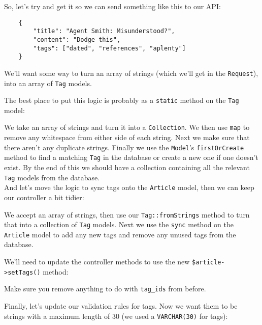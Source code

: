 So, let's try and get it so we can send something like this to our API:

\begin{verbatim}
    {
        "title": "Agent Smith: Misunderstood?",
        "content": "Dodge this",
        "tags": ["dated", "references", "aplenty"]
    }
\end{verbatim}


We'll want some way to turn an array of strings (which we'll get in the \texttt{Request}), into an array of \texttt{Tag} models.

\pagebreak

The best place to put this logic is probably as a \texttt{static} method on the \texttt{Tag} model:


We take an array of strings and turn it into a \texttt{Collection}. We then use \texttt{map} to remove any whitespace from either side of each string. Next we make sure that there aren't any duplicate strings. Finally we use the \texttt{Model}'s \texttt{firstOrCreate} method to find a matching \texttt{Tag} in the database or create a new one if one doesn't exist. By the end of this we should have a collection containing all the relevant \texttt{Tag} models from the database.
\\

And let's move the logic to sync tags onto the \texttt{Article} model, then we can keep our controller a bit tidier:


We accept an array of strings, then use our \texttt{Tag::fromStrings} method to turn that into a collection of \texttt{Tag} models. Next we use the \texttt{sync} method on the \texttt{Article} model to add any new tags and remove any unused tags from the database.

\pagebreak

We'll need to update the controller methods to use the new \texttt{\$article->setTags()} method:


Make sure you remove anything to do with \texttt{tag\_ids} from before.

\pagebreak

Finally, let's update our validation rules for tags. Now we want them to be strings with a maximum length of 30 (we used a \texttt{VARCHAR(30)} for tags):

